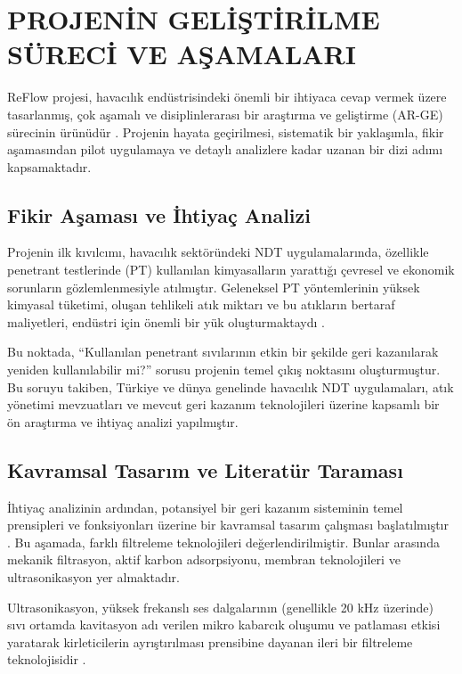 \documentclass[12pt,a4paper]{article}
\begin{document}
\section{PROJENİN GELİŞTİRİLME SÜRECİ VE AŞAMALARI}

ReFlow projesi, havacılık endüstrisindeki önemli bir ihtiyaca cevap vermek üzere tasarlanmış, çok aşamalı ve disiplinlerarası bir araştırma ve geliştirme (AR-GE) sürecinin ürünüdür \cite{kerzner2022project}. Projenin hayata geçirilmesi, sistematik bir yaklaşımla, fikir aşamasından pilot uygulamaya ve detaylı analizlere kadar uzanan bir dizi adımı kapsamaktadır.

\subsection{Fikir Aşaması ve İhtiyaç Analizi}

Projenin ilk kıvılcımı, havacılık sektöründeki NDT uygulamalarında, özellikle penetrant testlerinde (PT) kullanılan kimyasalların yarattığı çevresel ve ekonomik sorunların gözlemlenmesiyle atılmıştır. Geleneksel PT yöntemlerinin yüksek kimyasal tüketimi, oluşan tehlikeli atık miktarı ve bu atıkların bertaraf maliyetleri, endüstri için önemli bir yük oluşturmaktaydı \cite{dwivedi2018advances}.

Bu noktada, ``Kullanılan penetrant sıvılarının etkin bir şekilde geri kazanılarak yeniden kullanılabilir mi?'' sorusu projenin temel çıkış noktasını oluşturmuştur. Bu soruyu takiben, Türkiye ve dünya genelinde havacılık NDT uygulamaları, atık yönetimi mevzuatları ve mevcut geri kazanım teknolojileri üzerine kapsamlı bir ön araştırma ve ihtiyaç analizi yapılmıştır.

\subsection{Kavramsal Tasarım ve Literatür Taraması}

İhtiyaç analizinin ardından, potansiyel bir geri kazanım sisteminin temel prensipleri ve fonksiyonları üzerine bir kavramsal tasarım çalışması başlatılmıştır \cite{ulrich2021product}. Bu aşamada, farklı filtreleme teknolojileri değerlendirilmiştir. Bunlar arasında mekanik filtrasyon, aktif karbon adsorpsiyonu, membran teknolojileri ve ultrasonikasyon yer almaktadır.

Ultrasonikasyon, yüksek frekanslı ses dalgalarının (genellikle 20 kHz üzerinde) sıvı ortamda kavitasyon adı verilen mikro kabarcık oluşumu ve patlaması etkisi yaratarak kirleticilerin ayrıştırılması prensibine dayanan ileri bir filtreleme teknolojisidir \cite{zhang2018filtration}.
\end{document}
